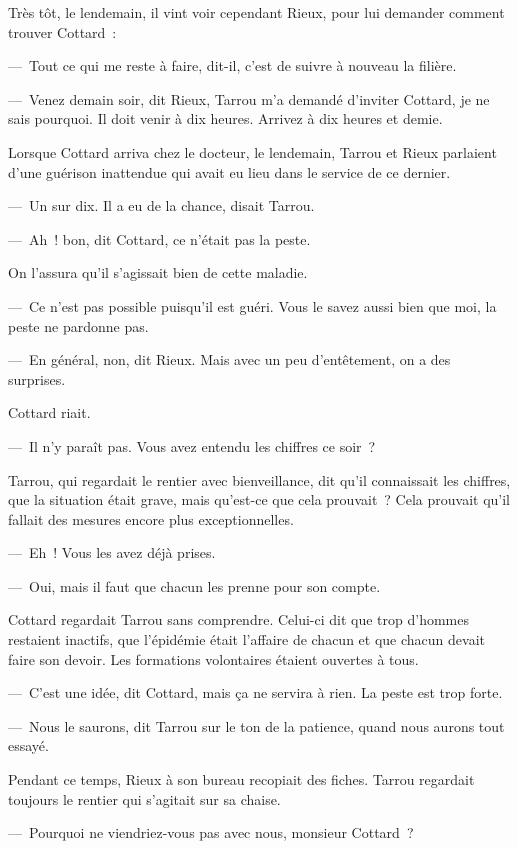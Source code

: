 \documentclass[french,twoside]{book} %
\begin{document}
Très tôt, le lendemain, il vint voir cependant Rieux, pour lui demander comment trouver Cottard :\par
— Tout ce qui me reste à faire, dit-il, c’est de suivre à nouveau la filière.\par
— Venez demain soir, dit Rieux, Tarrou m’a demandé d’inviter Cottard, je ne sais pourquoi. Il doit venir à dix heures. Arrivez à dix heures et demie.\par
Lorsque Cottard arriva chez le docteur, le lendemain, Tarrou et Rieux parlaient d’une guérison inattendue qui avait eu lieu dans le service de ce dernier.\par
— Un sur dix. Il a eu de la chance, disait Tarrou.\par
— Ah ! bon, dit Cottard, ce n’était pas la peste.\par
On l’assura qu’il s’agissait bien de cette maladie.\par
— Ce n’est pas possible puisqu’il est guéri. Vous le savez aussi bien que moi, la peste ne pardonne pas.\par
— En général, non, dit Rieux. Mais avec un peu d’entêtement, on a des surprises.\par
Cottard riait.\par
— Il n’y paraît pas. Vous avez entendu les chiffres ce soir ?\par
Tarrou, qui regardait le rentier avec bienveillance, dit qu’il connaissait les chiffres, que la situation était grave, mais qu’est-ce que cela prouvait ? Cela prouvait qu’il fallait des mesures encore plus exceptionnelles.\par
— Eh ! Vous les avez déjà prises.\par
— Oui, mais il faut que chacun les prenne pour son compte.\par
Cottard regardait Tarrou sans comprendre. Celui-ci dit que trop d’hommes restaient inactifs, que l’épidémie était l’affaire de chacun et que chacun devait faire son devoir. Les formations volontaires étaient ouvertes à tous.\par
— C’est une idée, dit Cottard, mais ça ne servira à rien. La peste est trop forte.\par
— Nous le saurons, dit Tarrou sur le ton de la patience, quand nous aurons tout essayé.\par
Pendant ce temps, Rieux à son bureau recopiait des fiches. Tarrou regardait toujours le rentier qui s’agitait sur sa chaise.\par
— Pourquoi ne viendriez-vous pas avec nous, monsieur Cottard ?\par
\end{document}
